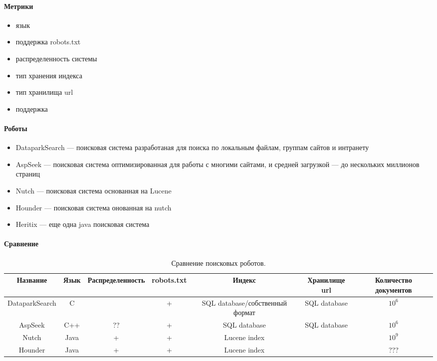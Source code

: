 \paragraph{Метрики}
\begin{itemize}
 \item язык
 \item поддержка robots.txt
 \item распределенность системы
 \item тип хранения индекса
 \item тип хранилища url
 \item поддержка
\end{itemize}
\paragraph{Роботы}
\begin{itemize}
 \item DataparkSearch --- поисковая система разработаная для поиска по локальным файлам, группам сайтов и интранету
 \item AspSeek --- поисковая система оптимизированная для работы с многими сайтами, и средней загрузкой --- до нескольких миллионов страниц
 \item Nutch --- поисковая система основанная на Lucene
 \item Hounder --- поисковая система онованная на nutch
 \item Heritix --- еще одна java поисковая система
\end{itemize}
\paragraph{Сравнение}
\begin{table}[h]
\caption{\label{tab:crawlers}Сравнение поисковых роботов.}
\begin{center}
\begin{tabular}{|c|c|c|c|c|c|c|}
\hline
Название & Язык & Распределенность & robots.txt & Индекс & Хранилище url & Количество документов\\
\hline
DataparkSearch & C & ~ & + & SQL database/собственный формат & SQL database & $10^{6}$\\
\hline
AspSeek & C++ & ?? & + & SQL database & SQL database & $10^{6}$\\
\hline
Nutch & Java & + & + & Lucene index &  & $10^{9}$\\
\hline
Hounder & Java & + & + & Lucene index &  & ???\\
\hline

\end{tabular}
\end{center}
\end{table}

